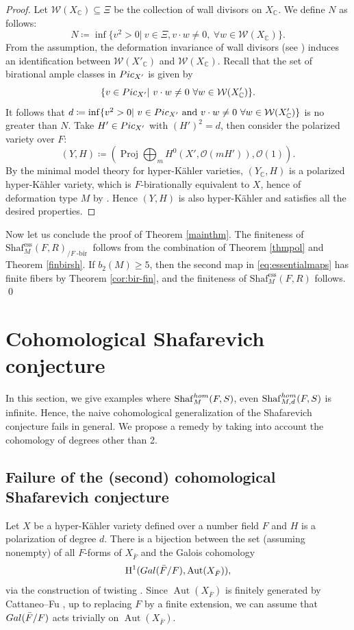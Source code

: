 \documentclass[11pt,reqno,oneside]{amsart}
\numberwithin{equation}{section}
\theoremstyle{definition}
\DeclareMathOperator{\Aut}{Aut}
\DeclareMathOperator{\ess}{ess}
\newcommand{\Pic}{{\rm Pic}}
\newcommand{\Gal}{{\rm Gal}}
\renewcommand{\hom}{{\rm hom}}
\newcommand{\Sha}{\mathrm{Shaf}}
\newcommand\rH{\mathrm{H}}
\newcommand{\CC}{\mathbb{C}}
\DeclareMathOperator{\bir}{-bir}
\begin{document}
\begin{proof}
Let $\mathcal{W}(X_\CC)\subseteq \Xi$ be the collection of wall divisors on $X_\CC$.
We define $N$ as follows:
\begin{equation}\label{bound-ba}
    N\coloneqq\inf\{ v^2>0|~v\in\Xi, v\cdot w\neq 0,~\forall w\in \mathcal{W}(X_\CC)\}.
\end{equation}
From the assumption,  the deformation invariance of wall divisors (see \cite{AV15})  induces an identification between $\mathcal{W}(X'_\CC)$ and $\mathcal{W}(X_\CC)$. Recall that the set of birational ample classes in $\Pic_{X'}$ is given by  
$$\{ v\in \Pic_{X'}|~v\cdot w\neq 0~\forall w\in \mathcal{W}(X'_\CC)\}.$$
It follows that  $d\coloneqq\inf \{ v^2>0|~v\in \Pic_{X'}~\hbox{and}~v\cdot w\neq 0~\forall w\in \mathcal{W}(X'_\CC)\}$ is no greater than $N$.  Take $H'\in \Pic_{X'}$ with $(H')^2=d$, then consider the polarized variety over $F$:
\[(Y, H)\coloneqq\left(\operatorname{Proj}\bigoplus_m H^0(X', \mathcal{O}(mH')), \mathcal{O}(1)\right).\]
By the minimal model theory for hyper-Kähler varieties, $(Y_\CC,H)$ is a polarized hyper-Kähler variety, which is $F$-birationally equivalent to $X$, hence of deformation type $M$ by \cite[Theorem 4.6]{MR1664696}. Hence $(Y, H)$ is also hyper-Kähler and satisfies all the desired properties. 
\end{proof}

Now let us conclude the proof of Theorem \ref{mainthm}. The finiteness of $\Sha_M^{\ess}(F,R)_{/ F\!\bir}$  follows  from  the combination of Theorem \ref{thmpol} and Theorem \ref{finbirsh}. If $b_2(M) \geq 5$, then the second map in \eqref{eq:essentialmaps} has finite fibers by Theorem \ref{cor:bir-fin}, and the finiteness of $\Sha_M^{\ess}(F,R)$ follows. \qed


\section{Cohomological Shafarevich conjecture}
\label{sectionremcoh}

In this section, we give examples where $\Sha^{\hom}_M(F,S)$, even $\Sha^{\hom}_{M,d}(F,S)$ is infinite. Hence, the naive cohomological generalization of the Shafarevich conjecture fails in general. We propose a remedy by taking into account the cohomology of degrees other than 2. 


\subsection{Failure of the (second) cohomological Shafarevich conjecture}
\label{subsec:Fail-secondCohomShafConj}
Let $X$ be a hyper-Kähler variety defined over a number field $F$ and $H$ is a polarization of degree $d$.  There is a bijection between the set (assuming nonempty) of all $F$-forms of $X_{\bar{F}}$  and the Galois cohomology 
\begin{equation}\label{eq:F-galois}
    \rH^1(\Gal(\bar{F}/F), \Aut(X_{\bar{F}})),
\end{equation} 
via the construction of twisting \cite{BorelSerre}. Since $\Aut(X_{\bar{F}})$ is finitely generated by Cattaneo--Fu \cite{CattaneoFu}, up to replacing $F$ by a finite extension, we can assume that $\Gal(\bar{F}/F)$ acts trivially on $\Aut(X_{\bar{F}})$. 
\end{document}
